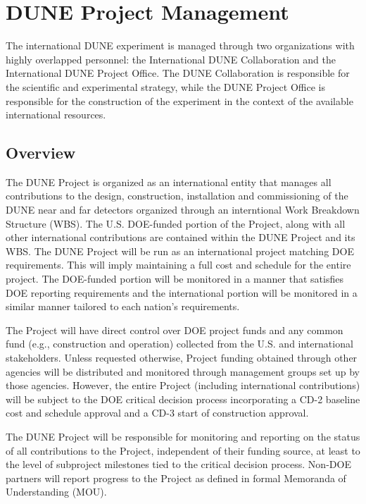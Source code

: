 \chapter{DUNE Project Management}
\label{ch:detectors-pm}

The international DUNE experiment is managed through two organizations
with highly overlapped personnel: the International DUNE Collaboration
and the International DUNE Project Office. The DUNE Collaboration is
responsible for the scientific and experimental strategy, while the
DUNE Project Office is responsible for the construction of the
experiment in the context of the available international resources.


\section{Overview}

The DUNE Project is organized as an international entity that manages
all contributions to the design, construction, installation and
commissioning of the DUNE near and far detectors organized through an
interntional Work Breakdown Structure (WBS). The U.S. DOE-funded
portion of the Project, along with all other international
contributions are contained within the DUNE Project and its WBS.  The DUNE Project
will be run as an international project matching DOE
requirements. This will imply maintaining a full cost and schedule for
the entire project.  The DOE-funded portion will be monitored in a
manner that satisfies DOE reporting requirements and the international
portion will be monitored in a similar manner tailored to each
nation's requirements.

The Project will have direct control over DOE project funds and any
common fund (e.g., construction and operation) collected from the
U.S. and international stakeholders. Unless requested otherwise,
Project funding obtained through other agencies will be distributed
and monitored through management groups set up by those agencies.
However, the entire Project (including international contributions)
will be subject to the DOE critical decision process incorporating a
CD-2 baseline cost and schedule approval and a CD-3 start of construction approval.

The DUNE Project will be responsible for monitoring and reporting on
the status of all contributions to the Project, independent of their
funding source, at least to the level of subproject milestones tied to
the critical decision process.  Non-DOE partners will report progress
to the Project as defined in formal Memoranda of Understanding (MOU).


